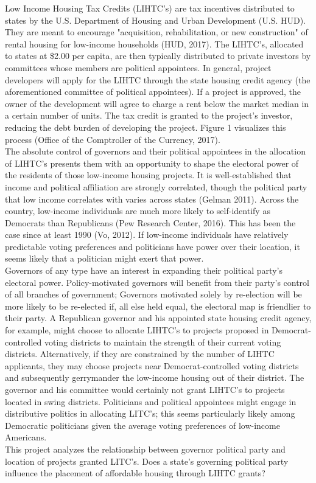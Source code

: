 \documentclass[a4paper,10pt]{article}
\begin{document}
\indent Low Income Housing Tax Credits (LIHTC's) are tax incentives distributed to states by the U.S. Department of Housing and Urban Development (U.S. HUD). They are meant to encourage "acquisition, rehabilitation, or new construction" of rental housing for low-income households (HUD, 2017). The LIHTC's, allocated to states at \$2.00 per capita, are then typically distributed to private investors by committees whose members are political appointees. In general, project developers will apply for the LIHTC through the state housing credit agency (the aforementioned committee of political appointees). If a project is approved, the owner of the development will agree to charge a rent below the market median in a certain number of units. The tax credit is granted to the project's investor, reducing the debt burden of developing the project. Figure 1 visualizes this process (Office of the Comptroller of the Currency, 2017).  \\
\indent The absolute control of governors and their political appointees in the allocation of LIHTC's presents them with an opportunity to shape the electoral power of the residents of those low-income housing projects. It is well-established that income and political affiliation are strongly correlated, though the political party that low income correlates with varies across states (Gelman 2011). Across the country, low-income individuals are much more likely to self-identify as Democrats than Republicans (Pew Research Center, 2016). This has been the case since at least 1990 (Vo, 2012). If low-income individuals have relatively predictable voting preferences and politicians have power over their location, it seems likely that a politician might exert that power. \\
\indent Governors of any type have an interest in expanding their political party's electoral power. Policy-motivated governors will benefit from their party's control of all branches of government; Governors motivated solely by re-election will be more likely to be re-elected if, all else held equal, the electoral map is friendlier to their party.  A Republican governor and his appointed state housing credit agency, for example, might choose to allocate LIHTC's to projects proposed in Democrat-controlled voting districts to maintain the strength of their current voting districts. Alternatively, if they are constrained by the number of LIHTC applicants, they may choose projects near Democrat-controlled voting districts and subsequently gerrymander the low-income housing out of their district. The governor and his committee would certainly not grant LIHTC's to projects located in swing districts. Politicians and political appointees might engage in distributive politics in allocating LITC's; this seems particularly likely among Democratic politicians given the average voting preferences of low-income Americans. \\
\indent This project analyzes the relationship between governor political party and location of projects granted LITC's. Does a state's governing political party influence the placement of affordable housing through LIHTC grants? 
\end{document}
